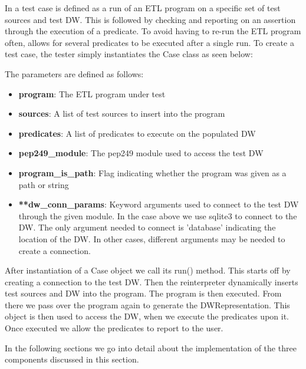 In \FW{} a test case is defined as a run of an ETL program on a specific set of test sources and test DW. This is followed by checking and reporting on an assertion through the execution of a predicate. To avoid having to re-run the ETL program often, \FW{} allows for several predicates to be executed after a single run. To create a test case, the tester simply instantiates the Case class as seen below:


The parameters are defined as follows:
\begin{itemize}
\item \textbf{program}: The ETL program under test
\item \textbf{sources}: A list of test sources to insert into the program
\item \textbf{predicates}: A list of predicates to execute on the populated DW
\item \textbf{pep249\_module}: The pep249 module used to access the test DW
\item \textbf{program\_is\_path}: Flag indicating whether the program was given as a path or string
\item \textbf{**dw\_conn\_params}: Keyword arguments used to connect to the test DW through the given module. In the case above we use sqlite3 to connect to the DW. The only argument needed to connect is 'database' indicating the location of the DW. In other cases, different arguments may be needed to create a connection.
\end{itemize}

After instantiation of a Case object we call its run() method. This starts off by creating a connection to the test DW. Then the reinterpreter dynamically inserts test sources and DW into the program. The program is then executed. From there we pass over the program again to generate the DWRepresentation. This object is then used to access the DW, when we execute the predicates upon it. Once executed we allow the predicates to report to the user.

In the following sections we go into detail about the implementation of the three components discussed in this section.







